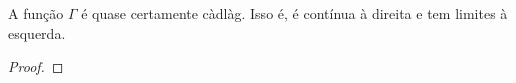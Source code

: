\begin{proposicao}
  \label{prop:gamma-cadlag}
  A função $\Gamma$ é quase certamente càdlàg. Isso é, é contínua à
  direita e tem limites à esquerda.
\end{proposicao}
\begin{proof}












\end{proof}



